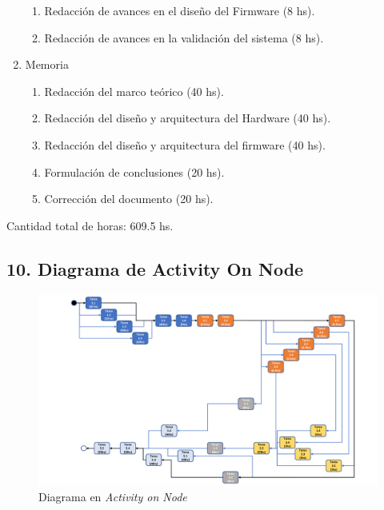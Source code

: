\documentclass[
11pt, %
codirector, %
]{charter}
\begin{document}
\begin{enumerate}
\begin{enumerate}
		      \item Redacción de avances en el diseño del Firmware (8 hs).
		      \item Redacción de avances en la validación del sistema (8 hs).
	      \end{enumerate}
	\item Memoria
	      \begin{enumerate}
		      \item Redacción del marco teórico (40 hs).
		      \item Redacción del diseño y arquitectura del Hardware (40 hs).
		      \item Redacción del diseño y arquitectura del firmware (40 hs).
		      \item Formulación de conclusiones (20 hs).
		      \item Corrección del documento (20 hs).
	      \end{enumerate}
\end{enumerate}

Cantidad total de horas: 609.5 hs.
\begin{landscape}
	\section{10. Diagrama de Activity On Node}
	\label{sec:AoN}

	\begin{figure}[htpb]
		\centering
		\includegraphics[width=1.25\textwidth]{./Figuras/Aon_cropped.pdf}
		\caption{Diagrama en \textit{Activity on Node}}
		\label{fig:AoN}
	\end{figure}
\end{landscape}
\end{document}

